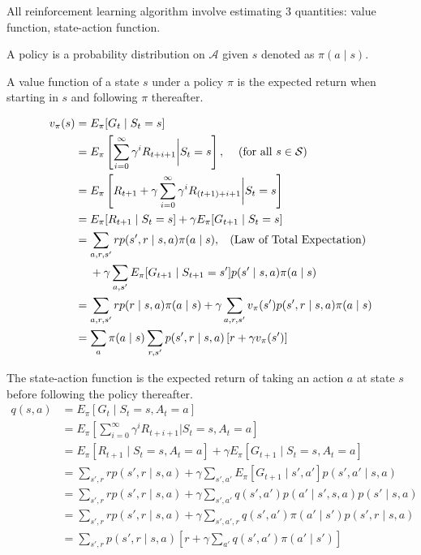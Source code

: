 \documentclass[twocolumn, 10pt]{article}
\newcommand{\actionset}{ \mathcal{A}}
\newcommand{\stateset}{\mathcal{S}}
\newcommand{\Mid}{ \bigg|}
\begin{document}
All reinforcement learning algorithm involve estimating 3 quantities: value function, state-action function.

A policy is a probability distribution on $\actionset$ given $s$ denoted as  $\pi (a \mid s)$.

A value function of a state $s$ under a policy $\pi$ is the expected return when starting in  $s$ and following $\pi$ thereafter.

$$ 
\begin{aligned}
v_{\pi}(s) &= E_{\pi} [G_t \mid S_t = s]  \\
                 &=  E_{\pi} \left[ \sum^{\infty}_{i=0}  \gamma^i R_{t + i + 1} \Mid S_t = s \right],  \hspace{2ex} \mbox{ (for all } s \in \stateset)  \\
                 &=  E_{\pi} \left[ R_{t+1} + \gamma \sum^{\infty}_{i=0} \gamma^i R_{(t+1) + i + 1} \Mid S_t = s \right] \\
                 &=  E_{\pi} [ R_{t+1} \mid S_t = s]  + \gamma  E_{\pi} [ G_{t+1} \mid S_t = s ] \\
                 &=  \sum_{a, r, s'} r p(s',  r \mid s , a) \pi(a \mid s) , \hspace{2ex} \mbox{(Law of Total Expectation)} \\ 
                 &\hspace{3ex} +  \gamma  \sum_{a, s'} E_{\pi}[G_{t + 1} \mid S_{t+1} = s'] p(s' \mid s, a)  \pi (a \mid s)  \\
                 &=  \sum_{a, r, s'} r p( r \mid s , a) \pi(a \mid s)  +  \gamma  \sum_{a, r, s'} v_{\pi}(s')  p(s'
                 , r \mid s, a)  \pi (a \mid s)  \\
                 &= \sum_{a} \pi(a \mid s)  \sum_{r, s'}   p(s', r \mid s, a)   \left[ r  + \gamma  v_{\pi}(s')  \right]
\end{aligned}
$$

The state-action function is the expected return  of taking an action $a$ at state $s$ before following the policy thereafter.
$$
\begin{aligned}
 q(s, a) &= E_{\pi} [G_t \mid S_t = s, A_t = a]  \\
             &= E_{\pi} \left[ \sum^{\infty}_{i=0}  \gamma^i R_{t + i + 1}  \Mid S_t = s , A_t = a\right]  \\
             &= E_{\pi} [R_{t+1} \mid S_t = s, A_t =  a] + \gamma E_{\pi} [ G_{t+1} \mid S_t = s, A_t =  a] \\
             &=  \sum_{s', r} r p(s', r  \mid s, a) + \gamma \sum_{s', a'} E_{\pi} [G_{t+1} \mid s', a'] p(s', a' \mid s, a) \\
             &=  \sum_{s', r} r p(s', r  \mid s, a) + \gamma \sum_{s', a'} q(s', a') p( a' \mid s',  s, a) p(s' \mid  s, a) \\
             &=  \sum_{s', r} r p(s', r  \mid s, a) + \gamma \sum_{s', a', r} q(s', a') \pi(a' \mid s')  p(s', r \mid  s, a) \\
             &=  \sum_{s', r}  p(s', r  \mid s, a) \left [ r + \gamma \sum_{a'} q(s', a') \pi(a' \mid s')  \right] 
 \end{aligned}
$$
\end{document}
